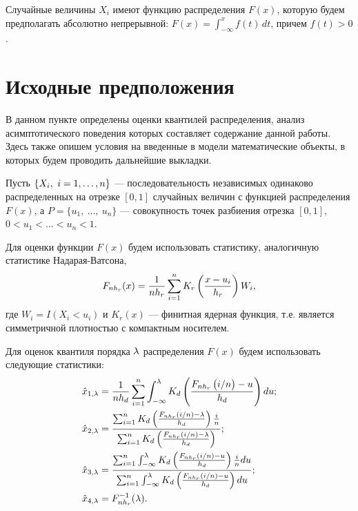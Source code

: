 \documentclass[a4paper,14pt,russian]{article}
\begin{document}
Случайные величины $X_i$ имеют функцию распределения $F(x)$, которую будем предполагать абсолютно непрерывной: $F(x)=\int _{-\infty }^{x}f(t)\,dt$, причем $f(t)>0$.


\newpage

\section{Исходные предположения}
В данном пункте определены оценки квантилей распределения, анализ асимптотического поведения которых составляет содержание данной работы. Здесь  также опишем условия на введенные в модели математические объекты, в которых будем проводить дальнейшие выкладки.

Пусть $\left\{X_i,\ i=1,\ldots,n\right\}$ --- последовательность независимых одинаково распределенных на отрезке $[0,1]$ случайных величин с функцией распределения $F(x)$, а $P = \{u_1,\ \ldots,\ u_n\}$ --- совокупность точек разбиения отрезка $[0,1]$, $0 < u_1 < \ldots < u_n < 1$.

Для оценки функции $F(x)$ будем использовать статистику, аналогичную статистике Надарая-Ватсона,
\begin{equation}\label{Fn}
F_{n h_r}(x) = \frac{1}{n h_r} \sum_{i=1}^{n} K_r \left(\frac{x-u_i}{h_r}\right)W_i,
\end{equation}
где $W_i=I(X_i<u_i)$ и $K_r(x)$ --- финитная ядерная функция, т.е. является симметричной плотностью с компактным носителем.

Для оценок квантиля порядка $\lambda$ распределения $F(x)$ будем использовать следующие статистики:
\begin{align}
\hat{x}_{1,\lambda} &= \frac{1}{n h_d} \sum_{i=1}^n \int_{-\infty}^\lambda
K_d\left(\frac{F_{n h_r}\left(i/n\right)-u}{h_d}\right)du;
\label{xla1}\\
\hat{x}_{2,\lambda} &= \frac{ \sum_{i=1}^{n} K_d\left(\frac{F_{n h_r}(i/n)-\lambda}{h_d}\right)\frac{i}{n}}{ \sum_{i=1}^{n} K_d\left(\frac{F_{n h_r}(i/n)-\lambda}{h_d}\right)};
\label{xla2}\\
\hat{x}_{3,\lambda} &= \frac{ \sum_{i=1}^{n} \int_{-\infty}^{\lambda} K_d\left(\frac{F_{n h_r}(i/n)-u}{h_d}\right)\frac{i}{n}du}{\sum_{i=1}^{n} \int_{-\infty}^{\lambda} K_d\left(\frac{F_{n h_r}(i/n)-u}{h_d}\right)du};
\label{xla3}\\
\hat{x}_{4,\lambda} &= F_{nh_r}^{-1}(\lambda).
\label{xla4}
\end{align}
\end{document}
